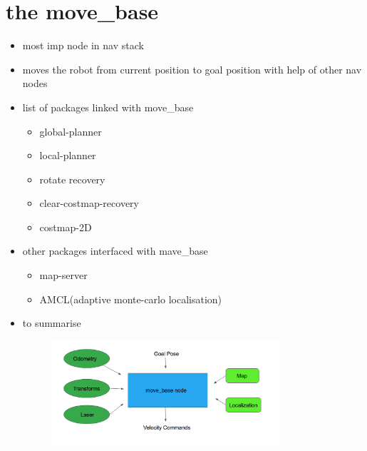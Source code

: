 \documentclass[a4paper]{article}
\begin{document}
\section{the move\_base}
\begin{itemize}
    \item most imp node in nav stack 
    \item moves the robot from current position to goal position with help of other nav nodes
    \item list of packages linked with move\_base
        \begin{itemize}
            \item global-planner
            \item local-planner
            \item rotate recovery 
            \item clear-costmap-recovery
            \item costmap-2D
        \end{itemize}
    \item other packages interfaced with mave\_base 
        \begin{itemize}
            \item map-server
            \item AMCL(adaptive monte-carlo localisation)
        \end{itemize}
    \item to summarise 
        \begin{figure}[h]
            \centering
            \includegraphics[width=0.8\textwidth]{./img/unit1-summary.png}
            \caption{}
            \label{fig:}
        \end{figure}
\end{itemize}
\end{document}
